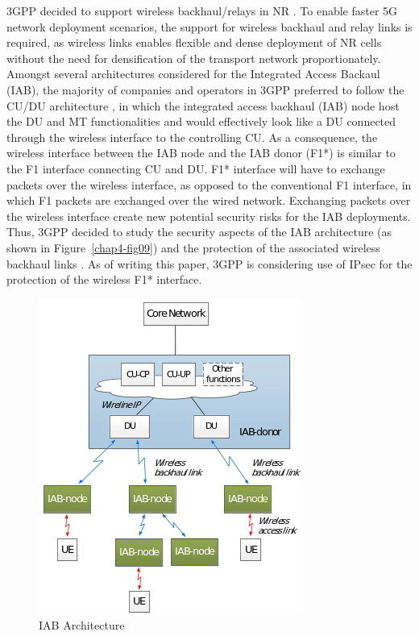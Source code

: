 \begin{multicols}{2}
3GPP decided to support wireless backhaul/relays in NR  \cite{art4-key07}. To enable faster 5G network deployment scenarios, the support for wireless backhaul and relay links is required, as wireless links enables flexible and dense deployment of NR cells without the need for densification of the transport network proportionately. Amongst several architectures considered for the Integrated Access Backaul (IAB), the majority of companies and operators in 3GPP preferred to follow the CU/DU architecture  \cite{art4-key07}, in which the integrated access backhaul (IAB) node host the DU and MT functionalities and would effectively look like a DU connected through the wireless interface to the controlling CU. As a consequence, the wireless interface between the IAB node and the IAB donor (F1*) is similar to the F1 interface connecting CU and DU. F1* interface will have to exchange packets over the wireless interface, as opposed to the conventional F1 interface, in which F1 packets are exchanged over the wired network. Exchanging packets over the wireless interface create new potential security risks for the IAB deployments. Thus, 3GPP decided to study the security aspects of the IAB architecture (as shown in Figure~\ref{chap4-fig09}) and the protection of the associated wireless backhaul links \cite{art4-key08}. As of writing this paper, 3GPP \cite{art4-key02} is considering use of IPsec for the protection of the wireless F1* interface.
\begin{figure}[H]
\centering
\includegraphics[scale=2.65]{src/Figures/chap4/chap4-fig10.jpg}
\caption{IAB Architecture}\label{chap4-fig10}
\end{figure}


\end{multicols}
